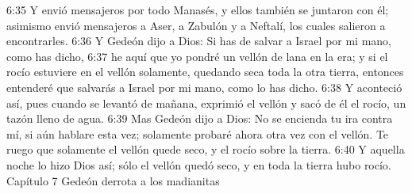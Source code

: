 6:35 Y envió mensajeros por todo Manasés, y ellos también se juntaron con él; asimismo envió mensajeros a Aser, a Zabulón y a Neftalí, los cuales salieron a encontrarles.  
6:36 Y Gedeón dijo a Dios: Si has de salvar a Israel por mi mano, como has dicho,  
6:37 he aquí que yo pondré un vellón de lana en la era; y si el rocío estuviere en el vellón solamente, quedando seca toda la otra tierra, entonces entenderé que salvarás a Israel por mi mano, como lo has dicho.  
6:38 Y aconteció así, pues cuando se levantó de mañana, exprimió el vellón y sacó de él el rocío, un tazón lleno de agua.  
6:39 Mas Gedeón dijo a Dios: No se encienda tu ira contra mí, si aún hablare esta vez; solamente probaré ahora otra vez con el vellón. Te ruego que solamente el vellón quede seco, y el rocío sobre la tierra.  
6:40 Y aquella noche lo hizo Dios así; sólo el vellón quedó seco, y en toda la tierra hubo rocío.  
Capítulo 7
Gedeón derrota a los madianitas  

